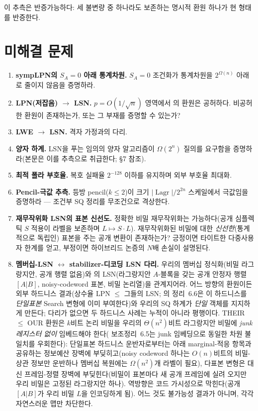 \documentclass[11pt,a4paper]{article}
\theoremstyle{plain}
\theoremstyle{definition}
\DeclareMathOperator{\Lagr}{Lagr}
\begin{document}
이 추측은 반증가능하다: 세 불변량 중 하나라도 보존하는 명시적 환원 하나가 현 형태를 반증한다.

\section{미해결 문제}
\label{sec:open-ko}

\begin{enumerate}
\item \textbf{sympLPN의 $S_A=0$ 아래 통계차원.} $S_A=0$ 조건화가 통계차원을 $2^{\Omega(n)}$ 아래로 줄이지 않음을 증명하라.
\item \textbf{LPN(저잡음) $\to$ LSN.} $p = O(1/\sqrt{n})$ 영역에서 \cite{KLP+25}의 환원은 공허하다. 비공허한 환원이 존재하는가, 또는 그 부재를 증명할 수 있는가?
\item \textbf{LWE $\to$ LSN.} 격자 가정과의 다리.
\item \textbf{양자 하계.} LSN을 푸는 임의의 양자 알고리즘이 $\Omega(2^n)$ 질의를 요구함을 증명하라(본문은 이를 추측으로 취급한다; \S7 참조).
\item \textbf{최적 폴라 부호율.} 복호 실패율 $2^{-128}$ 이하를 유지하며 외부 부호율 최대화.
\item \textbf{Pencil-극값 추측.} 등방 pencil($k \le 2$)이 크기 $|\Lagr|/2^{2n}$ 스케일에서 극값임을 증명하라 --- 조건부 SQ 정리를 무조건으로 격상한다.
\item \textbf{재무작위화 LSN의 표본 신선도.} 정확한 비밀 재무작위화는 가능하다(공개 심플렉틱 $S$ 적용이 라벨을 보존하며 $L \mapsto S\cdot L$). 재무작위화된 비밀에 대한 \emph{신선한}(통계적으로 독립인) 표본을 주는 공개 변환이 존재하는가? 긍정이면 타이트한 다중사용자 한계를 얻고, 부정이면 하이브리드 논증의 $N$배 손실이 설명된다.
\item \textbf{멤버십-LSN $\leftrightarrow$ stabilizer-디코딩 LSN 다리.} 우리의 멤버십 정식화(비밀 라그랑지안, 공개 행렬 없음)와 \cite{KLP+25,LPQR26}의 LSN(라그랑지안 $A$-블록을 갖는 공개 안정자 행렬 $[A|B]$, noisy-codeword 표본, 비밀 논리열)을 관계지어라. 어느 방향의 환원이든 외부 하드니스 결과(상수율 LPN $\le$ 그들의 LSN; \cite{KLP+25}의 정리~6.6은 이 하드니스를 \emph{단일표본} Search 변형에 이미 부여한다)와 우리의 SQ 하계가 \emph{단일} 객체를 지지하게 만든다; 다리가 없으면 두 하드니스 사례는 누적이 아니라 평행이다. THEIR $\le$ OUR 환원은 $k$비트 논리 비밀을 우리의 $\Theta(n^2)$비트 라그랑지안 비밀에 \emph{junk 레지스터 없이} 임베드해야 한다(\cite{KLP+25} 보조정리~6.5는 junk 임베딩으로 동일한 차원 불일치를 우회한다): 단일표본 하드니스 운반자로부터는 아래 marginal-적응 항목과 공유하는 정보예산 장벽에 부딪히고(noisy codeword 하나는 $O(n)$비트의 비밀-상관 정보만 운반하나 멤버십 복원에는 $\Omega(n^2)$개 라벨이 필요), 다표본 변형은 대신 프레임-정렬 장벽에 부딪힌다(비밀이 표본마다 새 공개 프레임에 실려 오지만 우리 비밀은 고정된 라그랑지안 하나). 역방향은 코드 가시성으로 막힌다(공개 $[A|B]$가 우리 비밀 $L$을 인코딩하게 됨). 어느 것도 불가능성 결과가 아니며, 각각 자연스러운 맵만 차단한다.

\end{enumerate}
\end{document}
